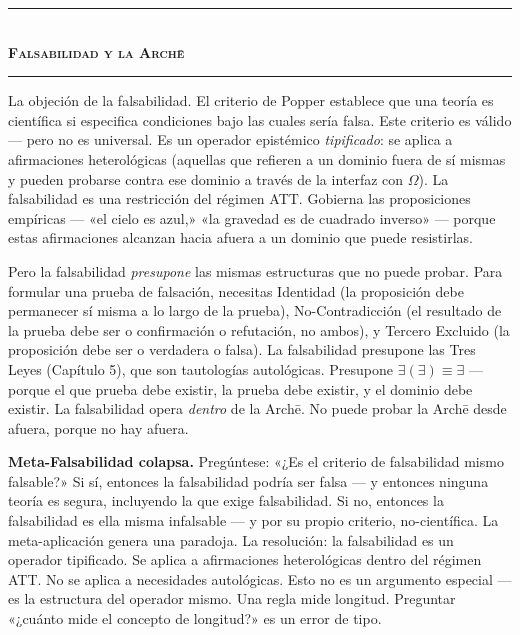 \documentclass[10pt, openany, oneside]{book}
\renewcommand{\normalsize}{\fontsize{10}{13}\selectfont}
\begin{document}
\vspace{1.5em}


\begin{center}
    \rule{0.3\textwidth}{0.4pt}\\[0.5em]
    {\normalsize\bfseries\scshape Falsabilidad y la Arch\={e}}\\[0.3em]
    \rule{0.3\textwidth}{0.4pt}
\end{center}

\vspace{1em}

\noindent La objeción de la falsabilidad. El criterio de Popper establece que una teoría es científica si especifica condiciones bajo las cuales sería falsa. Este criterio es válido --- pero no es universal. Es un operador epistémico \textit{tipificado}: se aplica a afirmaciones heterológicas (aquellas que refieren a un dominio fuera de sí mismas y pueden probarse contra ese dominio a través de la interfaz con $\Omega$). La falsabilidad es una restricción del régimen ATT. Gobierna las proposiciones empíricas --- «el cielo es azul,» «la gravedad es de cuadrado inverso» --- porque estas afirmaciones alcanzan hacia afuera a un dominio que puede resistirlas.

Pero la falsabilidad \textit{presupone} las mismas estructuras que no puede probar. Para formular una prueba de falsación, necesitas Identidad (la proposición debe permanecer sí misma a lo largo de la prueba), No-Contradicción (el resultado de la prueba debe ser o confirmación o refutación, no ambos), y Tercero Excluido (la proposición debe ser o verdadera o falsa). La falsabilidad presupone las Tres Leyes (Capítulo 5), que son tautologías autológicas. Presupone $\exists(\exists) \equiv \exists$ --- porque el que prueba debe existir, la prueba debe existir, y el dominio debe existir. La falsabilidad opera \textit{dentro} de la Arch\={e}. No puede probar la Arch\={e} desde afuera, porque no hay afuera.

\textbf{Meta-Falsabilidad colapsa.} Pregúntese: «¿Es el criterio de falsabilidad mismo falsable?» Si sí, entonces la falsabilidad podría ser falsa --- y entonces ninguna teoría es segura, incluyendo la que exige falsabilidad. Si no, entonces la falsabilidad es ella misma infalsable --- y por su propio criterio, no-científica. La meta-aplicación genera una paradoja. La resolución: la falsabilidad es un operador tipificado. Se aplica a afirmaciones heterológicas dentro del régimen ATT. No se aplica a necesidades autológicas. Esto no es un argumento especial --- es la estructura del operador mismo. Una regla mide longitud. Preguntar «¿cuánto mide el concepto de longitud?» es un error de tipo.
\end{document}
